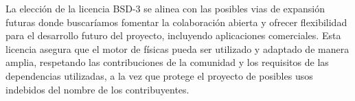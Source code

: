 La elección de la licencia BSD-3 se alinea con las posibles vias de expansión futuras donde buscaríamos fomentar la colaboración abierta y ofrecer flexibilidad para el desarrollo futuro del proyecto, incluyendo aplicaciones comerciales. Esta licencia asegura que el motor de físicas pueda ser utilizado y adaptado de manera amplia, respetando las contribuciones de la comunidad y los requisitos de las dependencias utilizadas, a la vez que protege el proyecto de posibles usos indebidos del nombre de los contribuyentes.

